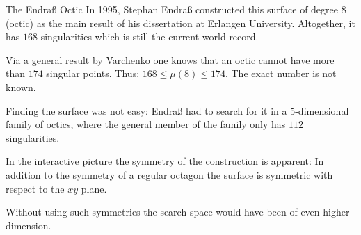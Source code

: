 \begin{surferPage}{The Endraß Octic}
     In 1995, Stephan Endraß constructed this surface of degree $8$ (octic) as the 
    main result of his dissertation at Erlangen University.
    Altogether, it has $168$ singularities which is still the current world
    record. 
  
     Via a general result by Varchenko one knows that an octic cannot have more
    than $174$ singular points.
    Thus: $168 \le \mu(8) \le 174$. 
    The exact number is not known.

     Finding the surface was not easy: Endraß had to search for it in a
    $5$-dimensional family of octics, where the general member of the family
    only has $112$ singularities.

    In the interactive picture the symmetry of the construction is apparent: 
    In addition to the symmetry of a regular octagon the surface is symmetric
    with respect to the $xy$ plane.

    Without using such symmetries the search space would have been of even
    higher dimension.
\end{surferPage}
